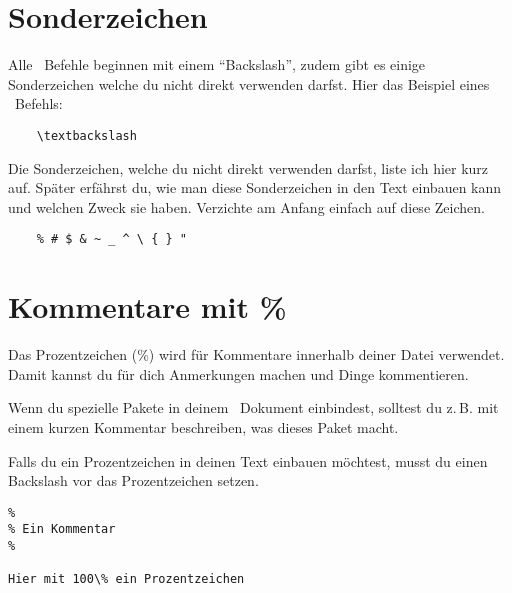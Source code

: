 
\section{Sonderzeichen}
\label{Sonderzeichen}

Alle \DMLLaTeX \ Befehle beginnen mit einem \enquote{Backslash}, zudem gibt es einige Sonderzeichen welche du nicht direkt verwenden darfst. Hier das Beispiel eines
\DMLLaTeX \ Befehls:
\begin{lstlisting}
	\textbackslash
\end{lstlisting}

Die Sonderzeichen, welche du nicht direkt verwenden darfst, liste ich hier kurz auf. Später erfährst du, wie man diese Sonderzeichen in den Text einbauen kann und welchen Zweck sie haben. Verzichte am Anfang einfach auf diese Zeichen.
\begin{lstlisting}
	% # $ & ~ _ ^ \ { } "
\end{lstlisting}

\section{Kommentare mit \%}

Das Prozentzeichen (\%) wird für Kommentare innerhalb deiner Datei verwendet. Damit kannst du für dich Anmerkungen machen und Dinge kommentieren. 

Wenn du spezielle Pakete in deinem \DMLLaTeX \ Dokument einbindest, solltest du z.\,B. mit einem kurzen Kommentar beschreiben, was dieses Paket macht.

Falls du ein Prozentzeichen in deinen Text einbauen möchtest, musst du einen Backslash vor das Prozentzeichen setzen.
\begin{lstlisting}
%
% Ein Kommentar
%

Hier mit 100\% ein Prozentzeichen
\end{lstlisting}



